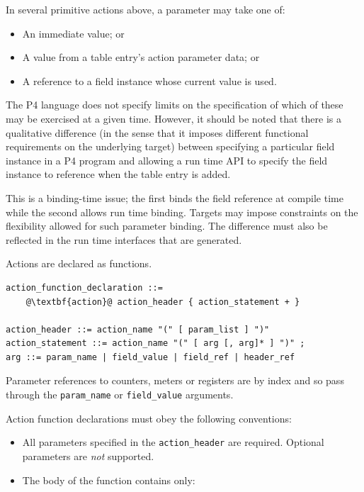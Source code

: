 \documentclass[12pt]{article}
\begin{document}

In several primitive actions above, a parameter may take one of:

\begin{itemize}
\item
An immediate value; or
\item
A value from a table entry's action parameter data; or
\item
A reference to a field instance whose current value is used.
\end{itemize}


The P4 language does not specify limits on the specification of which of these 
may be exercised at a given time. However, it should be noted that there is 
a qualitative difference (in the sense that it imposes different functional 
requirements on the underlying target) between specifying a particular field 
instance in a P4 program and allowing a run time API to specify the field 
instance to reference when the table entry is added. 

This is a binding-time issue; the first binds the field reference at compile 
time while the second allows run time binding. Targets may impose constraints 
on the flexibility allowed for such parameter binding. The difference must 
also be reflected in the run time interfaces that are generated.


Actions are declared as functions.

\begin{lstlisting}[frame=single,backgroundcolor=\color{bnfgreen},escapechar=\@]
action_function_declaration ::=
    @\textbf{action}@ action_header { action_statement + }

action_header ::= action_name "(" [ param_list ] ")"
action_statement ::= action_name "(" [ arg [, arg]* ] ")" ;
arg ::= param_name | field_value | field_ref | header_ref
\end{lstlisting}

Parameter references to counters, meters or registers are by index and so 
pass through the \texttt{param_name} or \texttt{field_value} arguments.

Action function declarations must obey the following conventions:

\begin{itemize}
\item
All parameters specified in the \texttt{action_header} are required. Optional parameters 
are \textit{not} supported.
\item
The body of the function contains only:
\end{itemize}
\end{document}
